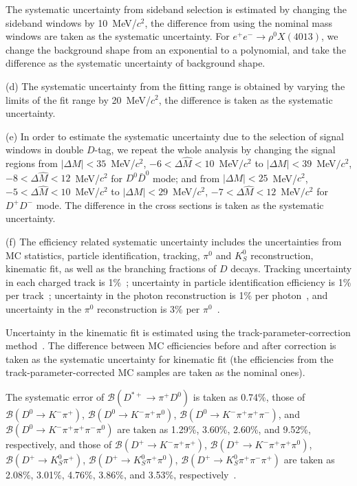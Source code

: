 \documentclass[aps,preprint,superscriptaddress,12pt,tightenlines]{revtex4}
\begin{document}
The systematic uncertainty from sideband selection is estimated by
changing the sideband windows by 10~MeV/$c^2$, the difference from
using the nominal mass windows are taken as the systematic
uncertainty. For $e^{+}e^{-}\to \rho^{0}X(4013)$, we change the
background shape from an exponential to a polynomial, and take the
difference as the systematic uncertainty of background shape.

(d) The systematic uncertainty from the fitting range is obtained
by varying the limits of the fit range by 20~MeV/$c^{2}$, the
difference is taken as the systematic uncertainty.

(e) In order to estimate the systematic uncertainty due to the
selection of signal windows in double $D$-tag, we repeat the whole
analysis by changing the signal regions from
$|\Delta{M}|<35$~MeV/$c^2$, $-6<\Delta\hat{M}<10$~MeV$/c^{2}$ to
$|\Delta{M}|<39$~MeV$/c^2$, $-8<\Delta\hat{M}<12$~MeV/$c^{2}$ for
$D^{0}\bar{D}^{0}$ mode; and from $|\Delta{M}|<25$~MeV/$c^2$,
$-5<\Delta\hat{M}<10$~MeV/$c^{2}$ to $|\Delta{M}|<29$~MeV/$c^2$,
$-7<\Delta\hat{M}<12$~MeV$/c^{2}$ for $D^{+}D^{-}$ mode. The
difference in the cross sections is taken as the systematic
uncertainty.

(f) The efficiency related systematic uncertainty includes the
uncertainties from MC statistics, particle identification,
tracking, $\pi^{0}$ and $K_{S}^{0}$ reconstruction, kinematic fit,
as well as the branching fractions of $D$ decays. Tracking
uncertainty in each charged track is 1\%~\cite{Tracking};
uncertainty in particle identification efficiency is 1\% per
track~\cite{Tracking}; uncertainty in the photon reconstruction is
1\% per photon~\cite{Photon}, and uncertainty in the $\pi^{0}$
reconstruction is 3\% per $\pi^{0}$~\cite{Photon}.

Uncertainty in the kinematic fit is estimated using the
track-parameter-correction method~\cite{kinematic fit}. The
difference between MC efficiencies before and after correction is
taken as the systematic uncertainty for kinematic fit (the
efficiencies from the track-parameter-corrected MC samples are
taken as the nominal ones).

The systematic error of $\mathcal{B}(D^{*+}\to \pi^{+}D^{0})$ is
taken as 0.74\%, those of $\mathcal{B}(D^{0}\to K^{-}\pi^{+})$,
$\mathcal{B}(D^{0}\to K^{-}\pi^{+}\pi^{0})$, $\mathcal{B}(D^{0}\to
K^{-}\pi^{+}\pi^{+}\pi^{-})$, and $\mathcal{B}(D^{0}\to
K^{-}\pi^{+}\pi^{+}\pi^{-}\pi^{0})$ are taken as 1.29\%, 3.60\%,
2.60\%, and 9.52\%, respectively, and those of
$\mathcal{B}(D^{+}\to K^{-}\pi^{+}\pi^{+})$, $\mathcal{B}(D^{+}\to
K^{-}\pi^{+}\pi^{+}\pi^{0})$, $\mathcal{B}(D^{+}\to
K^{0}_{S}\pi^{+})$, $\mathcal{B}(D^{+}\to
K^{0}_{S}\pi^{+}\pi^{0})$, $\mathcal{B}(D^{+}\to
K^{0}_{S}\pi^{+}\pi^{-}\pi^{+})$ are taken as 2.08\%, 3.01\%,
4.76\%, 3.86\%, and 3.53\%, respectively~\cite{PDG}.
\end{document}
